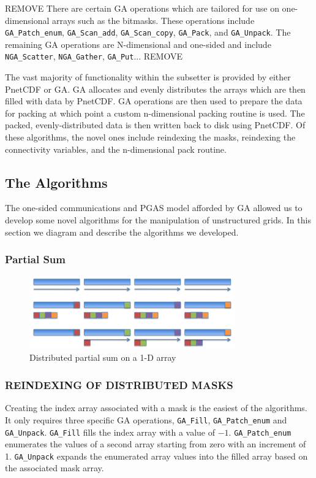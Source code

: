 REMOVE
There are certain GA operations which are tailored for use on one-dimensional
arrays such as the bitmasks.  These operations include \verb=GA_Patch_enum=,
\verb=GA_Scan_add=, \verb=GA_Scan_copy=, \verb=GA_Pack=, and \verb=GA_Unpack=.
The remaining GA operations are N-dimensional and one-sided and include
\verb=NGA_Scatter=, \verb=NGA_Gather=, \verb=GA_Put=...
REMOVE

The vast majority of functionality within the subsetter is provided by either
PnetCDF or GA.  GA allocates and evenly distributes the arrays which are then
filled with data by PnetCDF.  GA operations are then used to prepare the data
for packing at which point a custom n-dimensional packing routine is used.
The packed, evenly-distributed data is then written back to disk using
PnetCDF.  Of these algorithms, the novel ones include reindexing the masks,
reindexing the connectivity variables, and the n-dimensional pack routine.

\subsection{The Algorithms}

The one-sided communications and PGAS model afforded by GA allowed us to
develop some novel algorithms for the manipulation of unstructured grids.  In
this section we diagram and describe the algorithms we developed.

\subsubsection{Partial Sum}

\begin{figure}[!t]
\center
\includegraphics[width=3.5in]{images/partialsum}
\caption{Distributed partial sum on a 1-D array}
\label{fig:partialsum}
\end{figure}

\subsubsection{REINDEXING OF DISTRIBUTED MASKS}

Creating the index array associated with a mask is the easiest of the
algorithms.  It only requires three specific GA operations, \verb=GA_Fill=,
\verb=GA_Patch_enum= and \verb=GA_Unpack=.  \verb=GA_Fill= fills the index
array with a value of $-1$.  \verb=GA_Patch_enum= enumerates the values of a
second array starting from zero with an increment of 1.  \verb=GA_Unpack=
expands the enumerated array values into the filled array based on the
associated mask array.


